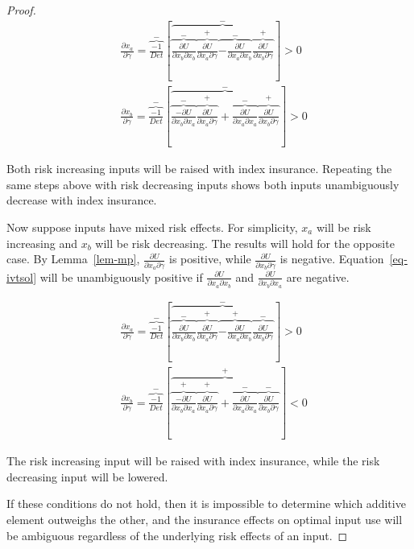 \documentclass[
  letterpaper,
  DIV=11,
  numbers=noendperiod]{scrartcl}
\theoremstyle{plain}
\theoremstyle{plain}
\theoremstyle{remark}
\begin{document}
\begin{proof}
\[
\begin{aligned}
&\frac{\partial x_a}{\partial \gamma}=\overbrace{\frac{-1}{Det}}^{-}\left[\overbrace{\overbrace{\frac{\partial U}{\partial x_b \partial x_b}}^{-}\overbrace{\frac{\partial U}{\partial x_a \partial \gamma}}^{+}\overbrace{-\frac{\partial U}{\partial x_a \partial x_b}}^{-}\overbrace{\frac{\partial U}{\partial x_b \partial \gamma}}^{+}}^{-}\right] >0\\
&\frac{\partial x_b}{\partial \gamma}=\overbrace{\frac{-1}{Det}}^{-}\left[\overbrace{\overbrace{\frac{-\partial U}{\partial x_b \partial x_a}}^{-}\overbrace{\frac{\partial U}{\partial x_a \partial \gamma}}^{+}+\overbrace{\frac{\partial U}{\partial x_a \partial x_a}}^{-}\overbrace{\frac{\partial U}{\partial x_b \partial \gamma}}^{+}}^{-}\right]>0
\end{aligned}
\]

Both risk increasing inputs will be raised with index insurance.
Repeating the same steps above with risk decreasing inputs shows both
inputs unambiguously decrease with index insurance.

Now suppose inputs have mixed risk effects. For simplicity, \(x_a\) will
be risk increasing and \(x_b\) will be risk decreasing. The results will
hold for the opposite case. By Lemma~\ref{lem-mp},
\(\frac{\partial U}{\partial x_a\partial \gamma}\) is positive, while
\(\frac{\partial U}{\partial x_b\partial \gamma}\) is negative.
Equation~\ref{eq-ivtsol} will be unambiguously positive if
\(\frac{\partial U}{\partial x_a\partial x_b}\) and
\(\frac{\partial U}{\partial x_b\partial x_a}\) are negative.

\[
\begin{aligned}
&\frac{\partial x_a}{\partial \gamma}=\overbrace{\frac{-1}{Det}}^{-}\left[\overbrace{\overbrace{\frac{\partial U}{\partial x_b\partial x_b}}^{-}\overbrace{\frac{\partial U}{\partial x_a \partial \gamma}}^{+}\overbrace{-\frac{\partial U}{\partial x_a \partial x_b}}^{+}\overbrace{\frac{\partial U}{\partial x_b\partial \gamma}}^{-}}^{-}\right] >0\\
&\frac{\partial x_b}{\partial \gamma}=\overbrace{\frac{-1}{Det}}^{-}\left[\overbrace{\overbrace{\frac{-\partial U}{\partial x_b\partial x_a}}^{+}\overbrace{\frac{\partial U}{\partial x_a \partial \gamma}}^{+}+\overbrace{\frac{\partial U}{\partial x_a \partial x_a}}^{-}\overbrace{\frac{\partial U}{\partial x_b\partial \gamma}}^{-}}^{+}\right]<0
\end{aligned}
\]

The risk increasing input will be raised with index insurance, while the
risk decreasing input will be lowered.

If these conditions do not hold, then it is impossible to determine
which additive element outweighs the other, and the insurance effects on
optimal input use will be ambiguous regardless of the underlying risk
effects of an input.
\end{proof}
\end{document}
